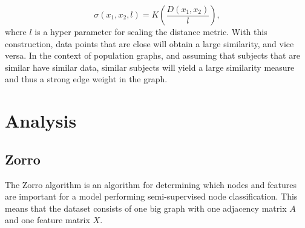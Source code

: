\begin{equation}
    \sigma(x_1,x_2, l) = K \left(\frac{D\left(x_1, x_2\right)}{l} \right),
    \label{eq:similarity_measure}
\end{equation}
where $l$ is a hyper parameter for scaling the distance metric. With this construction, data points that are close will obtain a large similarity, and vice versa. In the context of population graphs, and assuming that subjects that are similar have similar data, similar subjects will yield a large similarity measure and thus a strong edge weight in the graph. 


\section{Analysis}
\subsection{Zorro}\label{sec:zorro}

The Zorro algorithm is an algorithm for determining which nodes and features are important for a model performing semi-supervised node classification. This means that the dataset consists of one big graph with one adjacency matrix $A$ and one feature matrix $X$.


